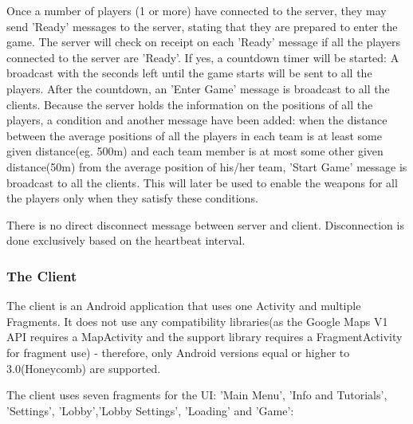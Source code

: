 \documentclass{article}
\begin{document}
Once a number of players (1 or more) have connected to the server, they may send
'Ready' messages to the server, stating that they are prepared to enter the
game. The server will check on receipt on each 'Ready' message if all the
players connected to the server are 'Ready'. If yes, a countdown timer will be
started: A broadcast with the seconds left until the game starts will be sent to
all the players. After the countdown, an 'Enter Game' message is broadcast to
all the clients. Because the server holds the information on the positions of
all the players, a condition and another message have been added: when the
distance between the average positions of all the players in each team is at
least some given distance(eg. 500m) and each team member is at most some other
given distance(50m) from the average position of his/her team, 'Start Game'
message is broadcast to all the clients. This will later be used to enable the
weapons for all the players only when they satisfy these conditions.\newline

There is no direct disconnect message between server and client. Disconnection
is done exclusively based on the heartbeat interval.\newline

\subsubsection{The Client}

The client is an Android application that uses one Activity and multiple
Fragments. It does not use any compatibility libraries(as the Google Maps V1 API
requires a MapActivity and the support library requires a FragmentActivity for
fragment use) - therefore, only Android versions equal or higher to
3.0(Honeycomb) are supported. 

The client uses seven fragments for the UI: 'Main Menu', 'Info and
Tutorials', 'Settings', 'Lobby','Lobby Settings', 'Loading' and 'Game':
\end{document}
